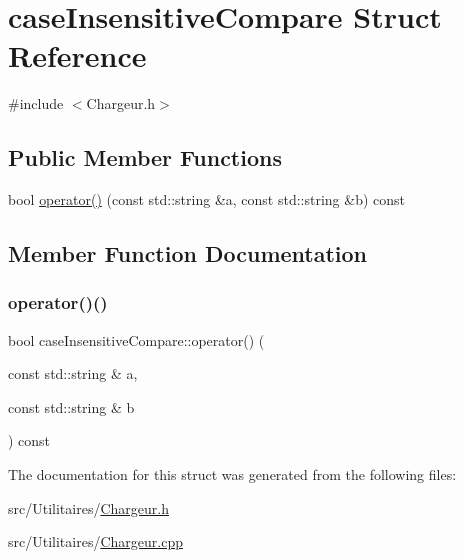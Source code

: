 \hypertarget{structcase_insensitive_compare}{}\section{case\+Insensitive\+Compare Struct Reference}
\label{structcase_insensitive_compare}


{\ttfamily \#include $<$Chargeur.\+h$>$}

\subsection*{Public Member Functions}
\begin{DoxyCompactItemize}
\item 
bool \mbox{\hyperlink{structcase_insensitive_compare_a3c5c719e651a350a54ccae077eda5d20}{operator()}} (const std\+::string \&a, const std\+::string \&b) const
\end{DoxyCompactItemize}


\subsection{Member Function Documentation}
\mbox{\label{structcase_insensitive_compare_a3c5c719e651a350a54ccae077eda5d20}} 
\subsubsection{\texorpdfstring{operator()()}{operator()()}}
{\footnotesize\ttfamily bool case\+Insensitive\+Compare\+::operator() (\begin{DoxyParamCaption}\item[{const std\+::string \&}]{a,  }\item[{const std\+::string \&}]{b }\end{DoxyParamCaption}) const}



The documentation for this struct was generated from the following files\+:\begin{DoxyCompactItemize}
\item 
src/\+Utilitaires/\mbox{\hyperlink{_chargeur_8h}{Chargeur.\+h}}\item 
src/\+Utilitaires/\mbox{\hyperlink{_chargeur_8cpp}{Chargeur.\+cpp}}\end{DoxyCompactItemize}
